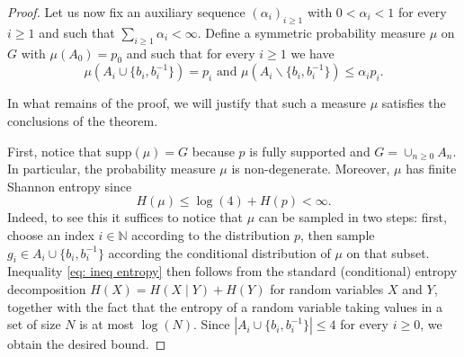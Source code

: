 \documentclass[reqno,a4paper,11pt]{amsart}
\numberwithin{equation}{section}
\newcommand{\1}{\mathbf{1}}
\def\N{{\mathbb N}}
\theoremstyle{definition}
\begin{document}
\begin{proof}
		
		Let us now fix an auxiliary sequence $(\alpha_i)_{i\ge 1}$ with $0<\alpha_i<1$ for every $i\ge 1$ and such that $\sum_{i\ge 1}\alpha_i<\infty.$ Define a symmetric probability measure $\mu$ on $G$ with $\mu(A_0)=p_0$ and such that for every $i\ge 1$ we have
		\begin{equation}\label{eq: def mu}
			\mu\left(A_i\cup \{b_i,b^{-1}_{i}\}\right)=p_i\text{ and }
			\mu\left(A_i\backslash\{b_i,b_i^{-1}\}\right)\le \alpha_i p_i.\end{equation}
		
		
		In what remains of the proof, we will justify that such a measure $\mu$ satisfies the conclusions of the theorem.
		
		First, notice that $\mathrm{supp}(\mu)=G$ because $p$ is fully supported and $G=\cup_{n\ge 0} A_n$. In particular, the probability measure $\mu$ is non-degenerate. Moreover, $\mu$ has finite Shannon entropy since
		\begin{equation}\label{eq: ineq entropy}
			H(\mu)\le \log(4)+H(p)<\infty.
		\end{equation}
		Indeed, to see this it suffices to notice that $\mu$ can be sampled in two steps: first, choose an index $i\in \N$ according to the distribution $p$, then sample $g_i \in A_i\cup \{b_i,b_i^{-1}\}$ according the conditional distribution of $\mu$ on that subset. Inequality \eqref{eq: ineq entropy} then follows from the standard (conditional) entropy decomposition $H(X)=H(X\mid Y)+H(Y)$ for random variables $X$ and $Y$, together with the fact that the entropy of a random variable taking values in a set of size $N$ is at most $\log(N)$. Since $|A_i \cup \{b_i, b_i^{-1}\}| \le 4$ for every $i \ge 0$, we obtain the desired bound.
		

\end{proof}
\end{document}
